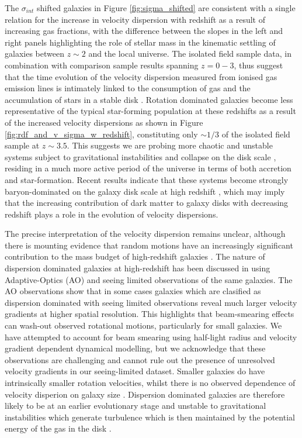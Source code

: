 \documentclass[fleqn,usenatbib]{mn2e}
\begin{document}
The $\sigma_{int}$ shifted galaxies in Figure \ref{fig:sigma_shifted} are consistent with a single relation for the increase in velocity dispersion with redshift as a result of increasing gas fractions, with the difference between the slopes in the left and right panels highlighting the role of stellar mass in the kinematic settling of galaxies between $z\sim2$ and the local universe. 
The isolated field sample data, in combination with comparison sample results spanning $z=0-3$, thus suggest that the time evolution of the velocity dispersion measured from ionised gas emission lines is intimately linked to the consumption of gas and the accumulation of stars in a stable disk \citep[e.g.][]{Law2009,Law2012b,Law2012c,Wisnioski2015}.
Rotation dominated galaxies become less representative of the typical star-forming population at these redshifts as a result of the increased velocity dispersions as shown in Figure \ref{fig:rdf_and_v_sigma_w_redshift}, constituting only $\sim1/3$ of the isolated field sample at $z\sim3.5$.
This suggests we are probing more chaotic and unstable systems subject to gravitational instabilities and collapse on the disk scale \citep{Burkert2010,Genzel2011}, residing in a much more active period of the universe in terms of both accretion and star-formation.
Recent results indicate that these systems become strongly baryon-dominated on the galaxy disk scale at high redshift \citep{Ubler2017,Lang2017,Genzel2017}, which may imply that the increasing contribution of dark matter to galaxy disks with decreasing redshift plays a role in the evolution of velocity dispersions.   

The precise interpretation of the velocity dispersion remains unclear, although there is mounting evidence that random motions have an increasingly significant contribution to the mass budget of high-redshift galaxies \citep[e.g.][]{Kassin2007,Law2009,Burkert2010,Kassin2012,Wuyts2016b,Lang2017,Ubler2017,Genzel2017}.
The nature of dispersion dominated galaxies at high-redshift has been discussed in \cite{Newman2013} using Adaptive-Optics (AO) and seeing limited observations of the same galaxies.
The AO observations show that in some cases galaxies which are clasified as dispersion dominated with seeing limited observations reveal much larger velocity gradients at higher spatial resolution.
This highlights that beam-smearing effects can wash-out observed rotational motions, particularly for small galaxies.
We have attempted to account for beam smearing using half-light radius and velocity gradient dependent dynamical modelling, but we acknowledge that these observations are challenging and cannot rule out the presence of unresolved velocity gradients in our seeing-limited dataset.
Smaller galaxies do have intrinsically smaller rotation velocities, whilst there is no observed dependence of velocity disperion on galaxy size \citep[e.g.][]{Newman2013}.
Dispersion dominated galaxies are therefore likely to be at an earlier evolutionary stage and unstable to gravitational instabilities which generate turbulence which is then maintained by the potential energy of the gas in the disk \citep{Burkert2010,Newman2013}.
\end{document}
